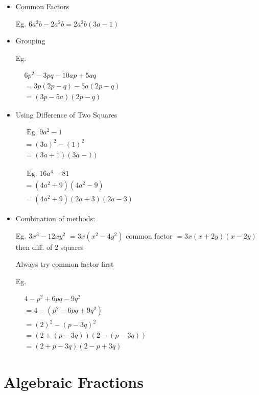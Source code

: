 \documentclass[twocolumn]{article}
\begin{document}
\begin{itemize} 
\item Common Factors

Eg. $6 a^3 b-2 a^2 b=2 a^2 b(3 a-1)$

\item Grouping

Eg.

$
\begin{aligned}
	& 6 p^2-3 p q-10 a p+5 a q \\
	& =3 p(2 p-q)-5 a(2 p-q) \\
	& =(3 p-5 a)(2 p-q)
\end{aligned}
$

\item Using Difference of Two Squares

$
\begin{aligned}
	& \text { Eg. } 9 a^2-1 \\
	& =(3a)^2 - (1)^2 \\
	& =(3 a+1)(3 a-1)
\end{aligned}
$

\noindent 
$
\begin{aligned}
	& \text { Eg. } 16 a^4-81 \\
	& =(4a^2+9)(4a^2-9) \\
	& =(4a^2+9)(2a+3)(2a-3)
\end{aligned}
$

\item Combination of methods:

Eg. $3 x^3-12 x y^2$
$=3 x\left(x^2-4 y^2\right)$ common factor
$=3 x(x+2 y)(x-2 y)$ then diff. of 2 squares

Always try common factor first

Eg.

$
\begin{aligned}
	& 4 - p^2 + 6pq - 9q^2  \\
	& =4 - (p^2 - 6pq + 9q^2) \\
	& =(2)^2 - (p-3q)^2 \\
	& =(2+(p-3q))(2-(p-3q)) \\
	& =(2+p-3q)(2-p+3q)
\end{aligned}
$

\end{itemize} 

\newpage 

\section*{Algebraic Fractions}
\end{document}
